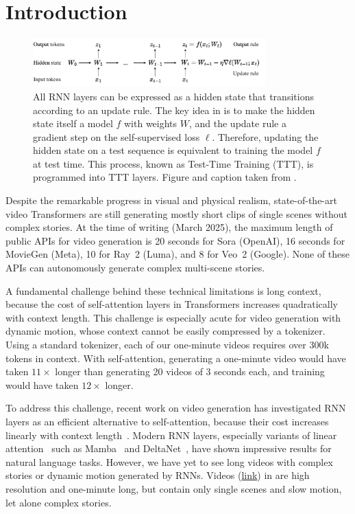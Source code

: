 \section{Introduction}
\label{sec:intro}

\begin{figure}[t!]
    \centering
    \includegraphics[width=0.8\textwidth]{figs/simple_teaser.pdf}
    \caption{All RNN layers can be expressed as a hidden state that transitions according to an update rule.
    The key idea in \cite{sun2024ttt} is to make the hidden state itself a model $f$ with weights $W$, and the update rule a gradient step on the self-supervised loss $\ell$.
    Therefore, updating the hidden state on a test sequence is equivalent to training the model $f$ at test time. 
    This process, known as Test-Time Training (TTT), is programmed into TTT layers. 
    Figure and caption taken from \cite{sun2024ttt}.
    }
    \label{fig:ttt-layer}
\end{figure}

Despite the remarkable progress in visual and physical realism, state-of-the-art video Transformers are still generating mostly short clips of single scenes without complex stories.
At the time of writing (March 2025), the maximum length of public APIs for video generation is 20 seconds for Sora (OpenAI), 16 seconds for MovieGen (Meta), 10 for Ray~2 (Luma), and 8 for Veo~2 (Google).
None of these APIs can autonomously generate complex multi-scene stories.

A fundamental challenge behind these technical limitations is long context, because the cost of self-attention layers in Transformers increases quadratically with context length.
This challenge is especially acute for video generation with dynamic motion, whose context cannot be easily compressed by a tokenizer.
Using a standard tokenizer, each of our one-minute videos requires over 300k tokens in context. 
With self-attention, generating a one-minute video would have taken $11\times$ longer than generating 20 videos of 3 seconds each, and training would have taken $12\times$ longer.

To address this challenge, recent work on video generation has investigated RNN layers as an efficient alternative to self-attention, because their cost increases linearly with context length~\cite{wang2024lingenhighresolutionminutelengthtexttovideo}.
Modern RNN layers, especially variants of linear attention~\cite{schmidhuberlinearattn, katharopoulos2020lineartransformers} such as Mamba~\cite{gu2024mamba, dao2024mamba2} and DeltaNet~\cite{schlag2021deltanet, yang2025gateddeltanetworksimproving}, have shown impressive results for natural language tasks.
However, we have yet to see long videos with complex stories or dynamic motion generated by RNNs.
Videos (\href{https://lineargen.github.io/}{link}) in \cite{wang2024lingenhighresolutionminutelengthtexttovideo} are high resolution and one-minute long, but contain only single scenes and slow motion, let alone complex stories.

